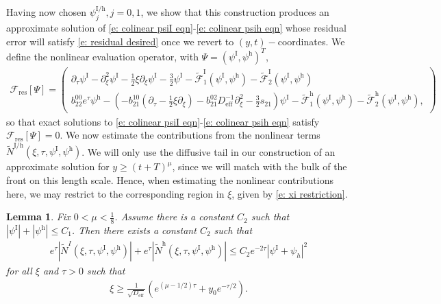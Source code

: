 \documentclass[11pt]{article}
\newcommand{\mcf}{\mathcal{F}}
\newtheorem{lemma}[prop]{Lemma}
\numberwithin{equation}{section}
\numberwithin{prop}{section}
\newcommand{\psih}{\psi^\mathrm{h}}
\newcommand{\Deff}{D_\mathrm{eff}}
\newcommand{\tfi}{\tilde{\mathcal{F}}^\mathrm{I}}
\newcommand{\tfh}{\tilde{\mathcal{F}}^\mathrm{h}}
\newcommand{\psiI}{\psi^\mathrm{I}}
\begin{document}
Having now chosen $\psi^\mathrm{I/h}_j, j = 0, 1$, we show that this construction produces an approximate solution of \eqref{e: colinear psiI eqn}-\eqref{e: colinear psih eqn} whose residual error will satisfy \eqref{e: residual desired} once we revert to $(y,t)-$coordinates. We define the nonlinear evaluation operator, with $\Psi = (\psiI, \psih)^T$, 
\begin{align}
\mcf_\mathrm{res} [\Psi] = \begin{pmatrix} \partial_\tau \psiI - \partial_\xi^2 \psiI - \frac{1}{2} \xi \partial_\xi \psiI - \frac{3}{2} \psiI - \tfi_1(\psiI, \psih) - \tfi_2 (\psiI, \psih) \\ b_{22}^{00} e^\tau \psih - \left( -b_{21}^{10} (\partial_\tau - \frac{1}{2} \xi \partial_\xi) - b_{21}^{02} \Deff^{-1} \partial_\xi^2 - \frac{3}{2} s_{21} \right) \psiI - \tfh_1(\psiI, \psih) - \tfh_2(\psiI, \psih),
\end{pmatrix}
\end{align}
so that exact solutions to \eqref{e: colinear psiI eqn}-\eqref{e: colinear psih eqn} satisfy $\mcf_\mathrm{res} [\Psi] = 0$. We now estimate the contributions from the nonlinear terms $\tilde{N}^\mathrm{I/h} (\xi, \tau, \psiI, \psih)$. We will only use the diffusive tail in our construction of an approximate solution for $y \geq (t+T)^\mu$, since we will match with the bulk of the front on this length scale. Hence, when estimating the nonlinear contributions here, we may restrict to the corresponding region in $\xi$, given by \eqref{e: xi restriction}. 
\begin{lemma}\label{l: colinear nonlinearity estimates}
	Fix $0 < \mu < \frac{1}{8}$. Assume there is a constant $C_2$ such that $|\psiI|+|\psih| \leq C_1$. Then there exists a constant $C_2$ such that 
	\begin{align}
	e^\tau |\tilde{N}^I (\xi, \tau, \psiI, \psih)| + e^\tau |\tilde{N}^\mathrm{h} (\xi, \tau, \psiI, \psih)| \leq C_2 e^{- 2 \tau} |\psiI + \psi_h|^2 \label{e: scaling variables nonlinearity estimate}
	\end{align}
	for all $\xi$ and $\tau> 0$ such that 
	\begin{align}
	\xi \geq \frac{1}{\sqrt{D_\mathrm{eff}}} \left( e^{(\mu-1/2) \tau} + y_0 e^{-\tau/2} \right). \label{e: xi restriction}
	\end{align}
\end{lemma}
\end{document}
